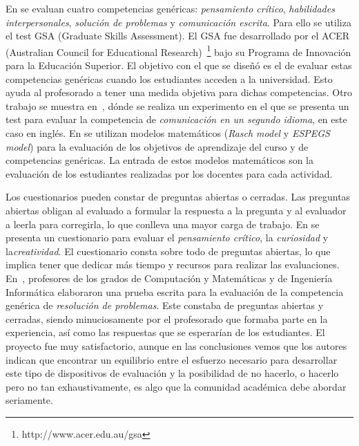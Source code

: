 En \cite{badcock2010developing} se evaluan cuatro competencias genéricas: \emph{pensamiento crítico}, \emph{habilidades interpersonales}, \emph{solución de problemas} y \emph{comunicación escrita}. Para ello se utiliza el test GSA (Graduate Skills Assessment). El GSA fue desarrollado por el ACER (Australian Council for Educational Research)~\footnote{http://www.acer.edu.au/gsa}  bajo su Programa de Innovación para la Educación Superior. El objetivo con el que se diseñó es el de evaluar estas competencias genéricas cuando los estudiantes acceden a la universidad. Esto ayuda al profesorado a tener una medida objetiva para dichas competencias. Otro trabajo se muestra en~\cite{fernandez2011experience}, dónde se realiza un experimento en el que se presenta un test para evaluar la competencia de \emph{comunicación en un segundo idioma}, en este caso en inglés. En \cite{aziz2007appraisal,rashid2008engineering,a2007outcome} se utilizan modelos matemáticos (\emph{Rasch model} y \emph{ESPEGS model}) para la evaluación de los objetivos de aprendizaje del curso y de competencias genéricas. La entrada de estos modelos matemáticos son la evaluación de los estudiantes realizadas por los docentes para cada actividad. 

Los cuestionarios pueden constar de preguntas abiertas o cerradas. Las preguntas abiertas obligan al evaluado a formular la respuesta a la pregunta y al evaluador a leerla para corregirla, lo que conlleva una mayor carga de trabajo. En \cite{albergaria2011critical} se presenta un cuestionario para evaluar el \emph{pensamiento crítico}, la \emph{curiosidad} y la\emph{creatividad}. El cuestionario consta sobre todo de preguntas abiertas, lo que implica tener que dedicar más tiempo y recursos para realizar las evaluaciones. En~\cite{vizcarro2013assessment}, profesores de los grados de Computación y Matemáticas y de Ingeniería Informática elaboraron una prueba escrita para la evaluación de la competencia genérica de \emph{resolución de problemas}. Este constaba de preguntas abiertas y cerradas, siendo minuciosamente por el profesorado que formaba parte en la experiencia, así como las respuestas que se esperarían de los estudiantes. El proyecto fue muy satisfactorio, aunque en las conclusiones vemos que los autores indican que encontrar un equilibrio entre el esfuerzo necesario para desarrollar este tipo de dispositivos de evaluación y la posibilidad de no hacerlo, o hacerlo pero no tan exhaustivamente, es algo que la comunidad académica debe abordar seriamente.



